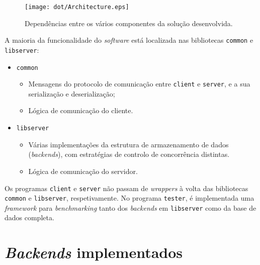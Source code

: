 \documentclass[11pt, a4paper]{article}
\begin{document}
\begin{minipage}{0.5\textwidth}
    \begin{figure}[H]
        \centering
        \texttt{[image: dot/Architecture.eps]}
        \caption{Dependências entre os vários componentes da solução desenvolvida.}
        \label{architecture}
    \end{figure}
\end{minipage}
\hspace{0.03\textwidth}
\begin{minipage}{0.47\textwidth}
    \setlength{\parskip}{\baselineskip}
    \setlength{\parindent}{0pt}
    A maioria da funcionalidade do \emph{software} está localizada nas bibliotecas \texttt{common} e
    \texttt{libserver}:

    \begin{itemize}
        \item \texttt{common}
        \begin{itemize}
            \item Mensagens do protocolo de comunicação entre \texttt{client} e \texttt{server}, e a
                sua serialização e deserialização;

            \item Lógica de comunicação do cliente.
        \end{itemize}

        \item \texttt{libserver}
        \begin{itemize}
            \item Várias implementações da estrutura de armazenamento de dados (\emph{backends}),
                com estratégias de controlo de concorrência distintas.

            \item Lógica de comunicação do servidor.
        \end{itemize}
    \end{itemize}
\end{minipage}

Os programas \texttt{client} e \texttt{server} não passam de \emph{wrappers} à volta das bibliotecas
\texttt{common} e \texttt{libserver}, respetivamente. No programa \texttt{tester}, é implementada
uma \emph{framework} para \emph{benchmarking} tanto dos \emph{backends} em \texttt{libserver} como
da base de dados completa.

\section{\emph{Backends} implementados}
\end{document}
